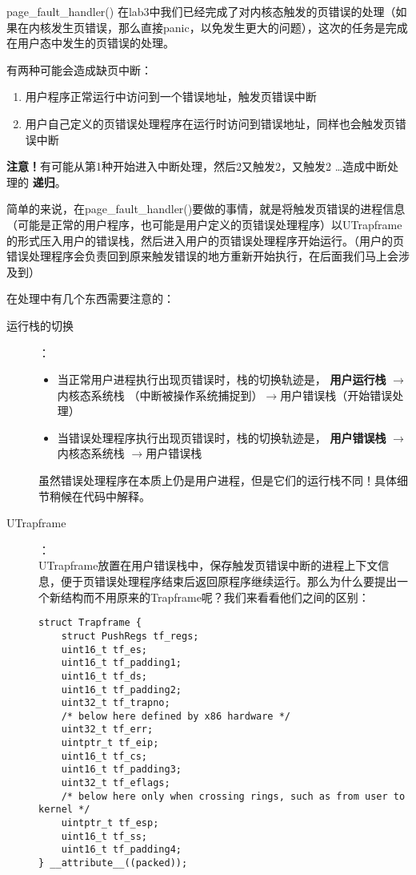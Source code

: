 \documentclass{article}
\newcommand{\highlight}[1]{{\bfseries \color{red}  #1}}
\newcommand{\funcname}[1]{{\ttfamily \small #1}}
\begin{document}
\begin{CJK*}{UTF8}{gkai}
\funcname{page\_fault\_handler()} 在lab3中我们已经完成了对内核态触发的页错误的处理（如果在内核发生页错误，那么直接panic，以免发生更大的问题），这次的任务是完成在用户态中发生的页错误的处理。


有两种可能会造成缺页中断：

\begin{enumerate}
\item{用户程序正常运行中访问到一个错误地址，触发页错误中断}
\item{用户自己定义的页错误处理程序在运行时访问到错误地址，同样也会触发页错误中断}
\end{enumerate}

\highlight{注意！}有可能从第1种开始进入中断处理，然后2又触发2，又触发2 \ldots 造成中断处理的\highlight{递归}。


简单的来说，在\funcname{page\_fault\_handler()}要做的事情，就是将触发页错误的进程信息（可能是正常的用户程序，也可能是用户定义的页错误处理程序）以UTrapframe的形式压入用户的错误栈，然后进入用户的页错误处理程序开始运行。（用户的页错误处理程序会负责回到原来触发错误的地方重新开始执行，在后面我们马上会涉及到）

在处理中有几个东西需要注意的：

\begin{description}
\item[运行栈的切换]：\\
\begin{itemize}
\item{当正常用户进程执行出现页错误时，栈的切换轨迹是，\highlight{用户运行栈} $\longrightarrow$内核态系统栈 （中断被操作系统捕捉到）$\longrightarrow$用户错误栈（开始错误处理）}
\item{当错误处理程序执行出现页错误时，栈的切换轨迹是，\highlight{用户错误栈} $\longrightarrow$内核态系统栈 $\longrightarrow$用户错误栈}
\end{itemize}

虽然错误处理程序在本质上仍是用户进程，但是它们的运行栈不同！具体细节稍候在代码中解释。

\item[UTrapframe]：\\


UTrapframe放置在用户错误栈中，保存触发页错误中断的进程上下文信息，便于页错误处理程序结束后返回原程序继续运行。那么为什么要提出一个新结构而不用原来的Trapframe呢？我们来看看他们之间的区别：

\begin{lstlisting}[style=ccode, firstnumber=56, title={\scriptsize \ttfamily \bfseries inc/trap.h}]
struct Trapframe {
	struct PushRegs tf_regs;
	uint16_t tf_es;
	uint16_t tf_padding1;
	uint16_t tf_ds;
	uint16_t tf_padding2;
	uint32_t tf_trapno;
	/* below here defined by x86 hardware */
	uint32_t tf_err;
	uintptr_t tf_eip;
	uint16_t tf_cs;
	uint16_t tf_padding3;
	uint32_t tf_eflags;
	/* below here only when crossing rings, such as from user to kernel */
	uintptr_t tf_esp;
	uint16_t tf_ss;
	uint16_t tf_padding4;
} __attribute__((packed));


\end{lstlisting}
\end{description}
\end{CJK*}
\end{document}
